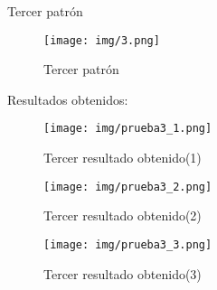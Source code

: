	Tercer patrón
	\begin{figure}[H]
		\begin{center}
			\texttt{[image: img/3.png]}
			\caption{Tercer patrón}
			\label{fig:patron3}
		\end{center}
	\end{figure}

	Resultados obtenidos:
	\begin{figure}[H]
		\begin{center}
			\texttt{[image: img/prueba3\_1.png]}
			\caption{Tercer resultado obtenido(1)}
			\label{fig:prueba3_1}
		\end{center}
	\end{figure}
	\begin{figure}[H]
		\begin{center}
			\texttt{[image: img/prueba3\_2.png]}
			\caption{Tercer resultado obtenido(2)}
			\label{fig:prueba3_2}
		\end{center}
	\end{figure}
	\begin{figure}[H]
		\begin{center}
			\texttt{[image: img/prueba3\_3.png]}
			\caption{Tercer resultado obtenido(3)}
			\label{fig:prueba3_3}
		\end{center}
	\end{figure}